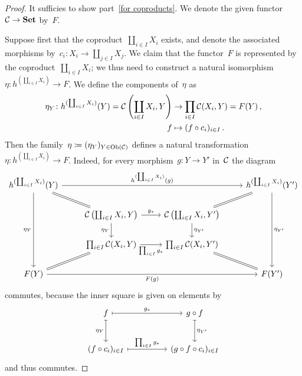 \begin{proof}
  It sufficies to show part~\ref*{for coproducts}.
  We denote the given functor~$\mathcal{C} \to \mathbf{Set}$ by~$F$.
  
  Suppose first that the coproduct~$\coprod_{i \in I} X_i$ exists, and denote the associated morphisms by~$c_i \colon X_i \to \coprod_{j \in I} X_j$.
  We claim that the functor~$F$ is represented by the coproduct~$\coprod_{i \in I} X_i$;
  we thus need to construct a natural isomorphism~$\eta \colon h^{(\coprod_{i \in I} X_i)} \to F$.
  We define the components of~$\eta$ as
  \begin{align*}
              \eta_Y
     \colon   h^{(\coprod_{i \in I} X_i)}(Y)
     =        \mathcal{C}\left( \coprod_{i \in I} X_i, Y \right)
    &\to      \prod_{i \in I} \mathcal{C}(X_i, Y)
     =        F(Y) \,,
     \\
              f
    &\mapsto  (f \circ c_i)_{i \in I} \,.
  \end{align*}
  Then the family~$\eta \coloneqq (\eta_Y)_{Y \in \operatorname{Ob}(\mathcal{C})}$ defines a natural transformation~$\eta \colon h^{(\coprod_{i \in I} X_i)} \to F$.
  Indeed, for every morphism~$g \colon Y \to Y'$ in~$\mathcal{C}$ the diagram
  \[
    \begin{tikzcd}
        h^{(\coprod_{i \in I} X_i)}(Y)
        \arrow{rrr}[above]{h^{(\coprod_{i \in I} X_i)}(g)}
        \arrow{ddd}[left]{\eta_Y}
        \arrow[equal]{dr}
      & {}
      & {}
      & h^{(\coprod_{i \in I} X_i)}(Y')
        \arrow{ddd}[right]{\eta_{Y'}}
        \arrow[equal]{dl}
      \\
        {}
      & \Ccat\left( \coprod_{i \in I} X_i, Y \right)
        \arrow{r}[above]{g_*}
        \arrow{d}[left]{\eta_Y}
      & \Ccat\left( \coprod_{i \in I} X_i, Y' \right)
        \arrow{d}[right]{\eta_{Y'}}
      & {}
      \\
        {}
      & \prod_{i \in I} \Ccat(X_i, Y)
        \arrow{r}[below]{\prod_{i \in I} g_*}
      & \prod_{i \in I} \Ccat(X_i, Y')
      & {}
      \\
        F(Y)
        \arrow[equal]{ur}
        \arrow{rrr}[below]{F(g)}
      & {}
      & {}
      & F(Y')
        \arrow[equal]{ul}
    \end{tikzcd}
  \]
  commutes, because the inner square is given on elements by
  \[
    \begin{tikzcd}[column sep = huge, row sep = large]
        f
        \arrow[maps to]{r}[above]{g_*}
        \arrow[maps to]{d}[left]{\eta_Y}
      & g \circ f
        \arrow[maps to]{d}[right]{\eta_{Y'}}
      \\
        (f \circ c_i)_{i \in I}
        \arrow[maps to]{r}[above]{\prod_{i \in I} g_*}
      & (g \circ f \circ c_i)_{i \in I}
    \end{tikzcd}
  \]
  and thus commutes.
  

\end{proof}
